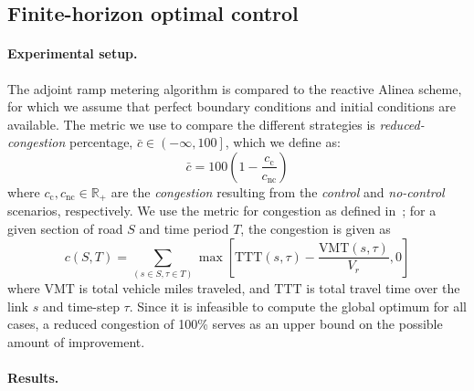 														
														
							\subsection{Finite-horizon optimal control\label{sub:Finite-horizon-optimal-control}}
														
														
							\paragraph{Experimental setup.}
														
							The adjoint ramp metering algorithm is compared to the reactive Alinea
							scheme, for which we assume that perfect boundary conditions and initial conditions
							are available. The metric we use to compare the different strategies is \emph{reduced-congestion} percentage, $\bar{c} \in \left(-\infty,100\right]$, which we define as:
							\[
							\bar{c} = 100 \left(1 - \frac{c_\text{c}}{c_{\text{nc}}}\right)
							\]where $c_\text{c}, c_{\text{nc}} \in \mathbb{R}_+$ are the \emph{congestion} resulting from the \emph{control} and \emph{no-control} scenarios, respectively. We use the metric for congestion as defined in~\cite{Skabardonis2003}; for a given section of road $S$ and time period $T$, the congestion is given as
							\[
							c\left(S,T\right) = \sum_{\left(s\in S, \tau\in T\right)} \max \left[\text{TTT}\left(s,\tau\right) - \frac{\text{VMT}\left(s, \tau\right)}{V_r}, 0\right]
							\] where $\text{VMT}$ is total vehicle miles traveled, and $\text{TTT}$ is total travel time over the link $s$ and time-step $\tau$. Since it is infeasible to compute the global optimum for all cases, a reduced congestion of 100\% serves as an upper bound on the possible amount of improvement.

							\paragraph{Results.}
														
